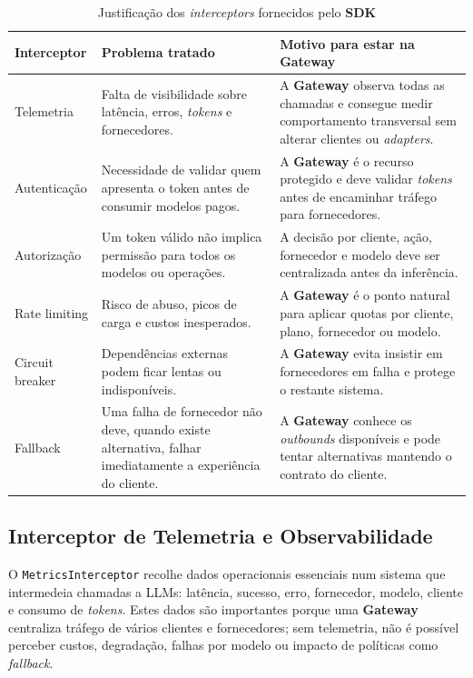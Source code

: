     \begin{table}[H]
        \centering
        \footnotesize
        \renewcommand{\arraystretch}{1.25}
        \begin{tabularx}{\textwidth}{|>{\raggedright\arraybackslash}p{3.2cm}|Y|Y|}
            \hline
            \textbf{Interceptor} & \textbf{Problema tratado} & \textbf{Motivo para estar na Gateway} \\
            \hline
            Telemetria & Falta de visibilidade sobre latência, erros, \textit{tokens} e fornecedores. & A \textbf{Gateway} observa todas as chamadas e consegue medir comportamento transversal sem alterar clientes ou \textit{adapters}. \\
            \hline
            Autenticação & Necessidade de validar quem apresenta o token antes de consumir modelos pagos. & A \textbf{Gateway} é o recurso protegido e deve validar \textit{tokens} antes de encaminhar tráfego para fornecedores. \\
            \hline
            Autorização & Um token válido não implica permissão para todos os modelos ou operações. & A decisão por cliente, ação, fornecedor e modelo deve ser centralizada antes da inferência. \\
            \hline
            Rate limiting & Risco de abuso, picos de carga e custos inesperados. & A \textbf{Gateway} é o ponto natural para aplicar quotas por cliente, plano, fornecedor ou modelo. \\
            \hline
            Circuit breaker & Dependências externas podem ficar lentas ou indisponíveis. & A \textbf{Gateway} evita insistir em fornecedores em falha e protege o restante sistema. \\
            \hline
            Fallback & Uma falha de fornecedor não deve, quando existe alternativa, falhar imediatamente a experiência do cliente. & A \textbf{Gateway} conhece os \textit{outbounds} disponíveis e pode tentar alternativas mantendo o contrato do cliente. \\
            \hline
        \end{tabularx}
        \caption{Justificação dos \textit{interceptors} fornecidos pelo \textbf{SDK}}
        \label{tab:interceptor-rationale}
    \end{table}

    \subsection{Interceptor de Telemetria e Observabilidade}
    O \texttt{MetricsInterceptor} recolhe dados operacionais essenciais num sistema que intermedeia chamadas a LLMs: latência, sucesso, erro, fornecedor, modelo, cliente e consumo de \textit{tokens}. Estes dados são importantes porque uma \textbf{Gateway} centraliza tráfego de vários clientes e fornecedores; sem telemetria, não é possível perceber custos, degradação, falhas por modelo ou impacto de políticas como \textit{fallback}.

